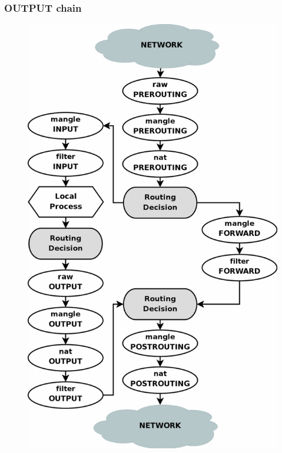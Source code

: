 \documentclass{beamer}
\begin{document}
\begin{frame}
\frametitle{OUTPUT chain}
\begin{figure}
\includegraphics[trim={0 0 0 18cm},clip, width=\textwidth]{tables_traverse}
\end{figure}
\end{frame}
\end{document}
